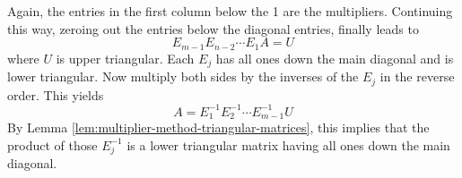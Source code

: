 Again, the entries in the first column below the 1 are the multipliers.
Continuing this way, zeroing out the entries below the diagonal entries,
finally leads to 
\begin{equation*}
E_{m-1}E_{n-2}\cdots E_{1}A=U
\end{equation*}
where $U$ is upper triangular. Each $E_{j}$ has all ones down the main
diagonal and is lower triangular. Now multiply both sides by the inverses of
the $E_{j}$ in the reverse order$.$ This yields 
\begin{equation*}
A=E_{1}^{-1}E_{2}^{-1}\cdots E_{m-1}^{-1}U
\end{equation*}
By Lemma \ref{lem:multiplier-method-triangular-matrices}, this implies that the product of those $E_{j}^{-1}$
is a lower triangular matrix having all ones down the main diagonal.


